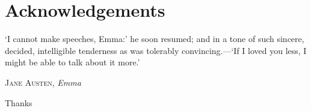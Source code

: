 \chapter{Acknowledgements}

\epigraph{\singlespacing%
`I cannot make speeches, Emma:' he soon resumed; and in a tone of such sincere, decided, intelligible tenderness as was tolerably convincing.---`If I loved you less, I might be able to talk about it more.'
}{\textsc{Jane Austen}, \textit{Emma}}

Thanks
